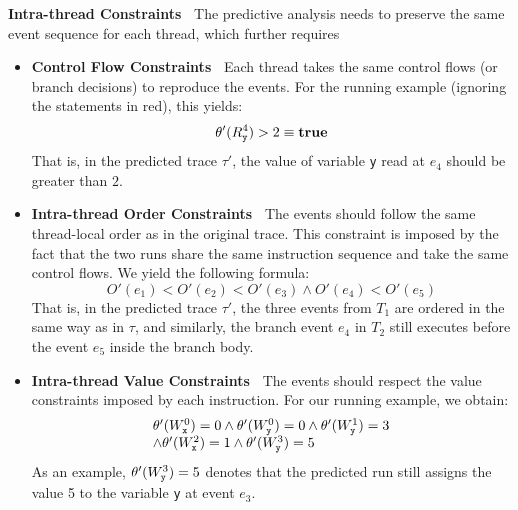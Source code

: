 {\bf Intra-thread Constraints\ } The predictive analysis needs to preserve the same event sequence for each thread, which further requires 

\begin{itemize}
\item {\bf Control Flow Constraints\ } Each thread takes the same control flows (or branch decisions) to reproduce the events.
 For the running example (ignoring the statements in red), this yields:
$$
	\theta'(R_{\tt y}^4) > 2 \equiv {\bf true}
$$
That is, in the predicted trace $\tau'$, the value of variable {\tt y} read at $e_4$ should be greater than $2$. 


\item {\bf Intra-thread Order Constraints\ } The events should follow the same thread-local order as in the original trace. This constraint is imposed by the fact that the two runs share the same instruction sequence and take the same control flows. 
We yield the following formula:
$$
	O'(e_1) < O'(e_2) < O'(e_3) \wedge O'(e_4) < O'(e_5)
$$
That is, in the predicted trace $\tau'$, the three events from $T_1$ are ordered in the same way as in $\tau$, and similarly, the branch event $e_4$ in $T_2$ still executes before the event $e_5$ inside the branch body.

\item {\bf Intra-thread Value Constraints\ } The events should respect the value constraints imposed by each instruction.
 For our running example, we obtain:
$$
\begin{array}{l}
	\theta'(W_{\tt x}^0) = 0 \wedge \theta'(W_{\tt y}^0) = 0 \wedge \theta'(W_{\tt y}^1) = 3 \\ 
	\wedge	\theta'(W_{\tt x}^2) = 1 \wedge \theta'(W_{\tt y}^3) = 5
	\end{array}
$$
As an example, $\theta'(W_{\tt y}^3)= 5$ denotes that the predicted run still assigns the value 5 to the variable {\tt y}  at event $e_3$.
\end{itemize}





